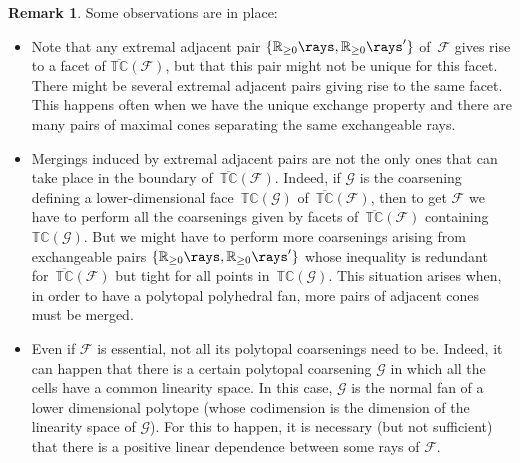 \documentclass{amsart}
\theoremstyle{definition}
\newtheorem{remark}[theorem]{Remark}
\newcommand{\R}{\mathbb{R}} %
\renewcommand{\c}[1]{{\mathcal{#1}}} %
\newcommand{\Fan}{\mathcal{F}} %
\newcommand{\typeCone}{\mathbb{TC}} %
\newcommand{\ctypeCone}{\overline{\mathbb{TC}}} %
\begin{document}
\begin{remark}
Some observations are in place:

\begin{itemize}
\item Note that any extremal adjacent pair $\{\R_{\ge0}\rays, \R_{\ge0}\rays'\}$ of~$\Fan$ gives rise to a facet of $\ctypeCone(\Fan)$, but that this pair might not be unique for this facet. There might be several extremal adjacent pairs giving rise to the same facet. This happens often when we have the unique exchange property and there are many pairs of maximal cones separating the same exchangeable rays.
 
\item Mergings induced by extremal adjacent pairs are not the only ones that can take place in the boundary of~$\ctypeCone(\Fan)$. Indeed, if $\c{G}$ is the coarsening defining a lower-dimensional face~$\typeCone(\c{G})$ of~$\ctypeCone(\Fan)$, then to get $\Fan$ we have to perform all the coarsenings given by facets of~$\ctypeCone(\Fan)$ containing~$\typeCone(\c{G})$. But we might have to perform more coarsenings arising from exchangeable pairs  $\{\R_{\ge0}\rays, \R_{\ge0}\rays'\}$ whose inequality is redundant for~$\ctypeCone(\Fan)$ but tight for all points in~$\typeCone(\c{G})$.  This situation arises when, in order to have a polytopal polyhedral fan, more pairs of adjacent cones must be merged.

\item Even if $\Fan$ is essential, not all its polytopal coarsenings need to be. Indeed, it can happen that there is a certain polytopal coarsening $\c{G}$ in which all the cells have a common linearity space. In this case, $\c{G}$ is the normal fan of a lower dimensional polytope (whose codimension is the dimension of the linearity space of $\c{G}$). For this to happen, it is necessary (but not sufficient) that there is a positive linear dependence between some rays of $\Fan$. 
\end{itemize}
\end{remark}
\end{document}

